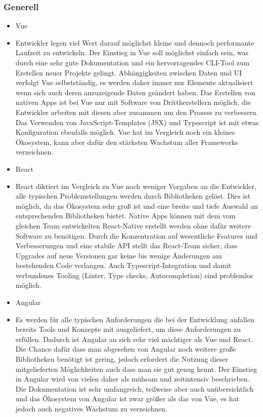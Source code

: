 \subsubsection{Generell}
\begin{itemize}
    \item{Vue}
    \item[] Entwickler legen viel Wert darauf möglichst kleine und dennoch performante Laufzeit zu entwickeln. Der Einstieg in Vue soll möglichst einfach sein, was durch eine sehr gute Dokumentation und ein hervorragendes CLI-Tool zum Erstellen neuer Projekte gelingt. Abhängigkeiten zwischen Daten und UI verfolgt Vue selbstständig, es werden daher immer nur Elemente aktualisiert wenn sich auch deren anzuzeigende Daten geändert haben. Das Erstellen von nativen Apps ist bei Vue nur mit Software von Drittherstellern möglich, die Entwickler arbeiten mit diesen aber zusammen um den Prozess zu verbessern. Das Verwenden von JavaScript-Templates (JSX) und Typescript ist mit etwas Konfiguration ebenfalls möglich. Vue hat im Vergleich noch ein kleines Ökosystem, kann aber dafür den stärksten Wachstum aller Frameworks verzeichnen.
    \item{React}
    \item[] React diktiert im Vergleich zu Vue noch weniger Vorgaben an die Entwickler, alle typischen Problemstellungen werden durch Bibliotheken gelöst. Dies ist möglich, da das Ökosystem sehr groß ist und eine breite und tiefe Auswahl an entsprechenden Bibliotheken bietet. Native Apps können mit dem vom gleichen Team entwickelten React-Native erstellt werden ohne dafür weitere Software zu benötigen. Durch die Konzentration auf wesentliche Features und Verbesserungen und eine stabile API stellt das React-Team sicher, dass Upgrades auf neue Versionen gar keine bis wenige Änderungen am bestehenden Code verlangen. Auch Typescript-Integration und damit verbundenes Tooling (Linter, Type checks, Autocompletion) sind problemlos möglich.
    \item{Angular}
    \item[] Es werden für alle typischen Anforderungen die bei der Entwicklung anfallen bereits Tools und Konzepte mit ausgeliefert, um diese Anforderungen zu erfüllen. Dadurch ist Angular an sich sehr viel mächtiger als Vue und React. Die Chance dafür dass man abgesehen von Angular noch weitere große Bibliotheken benötigt ist gering, jedoch erfordert die Nutzung dieser mitgelieferten Möglichkeiten auch dass man sie gut genug kennt. Der Einstieg in Angular wird von vielen daher als mühsam und zeitintensiv beschrieben. Die Dokumentation ist sehr umfangreich, teilweise aber auch unübersichtlich und das Ökosystem von Angular ist zwar größer als das von Vue, es hat jedoch auch negatives Wachstum zu verzeichnen.
\end{itemize}

